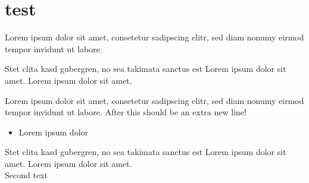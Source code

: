 \documentclass[11pt]{article}
\begin{document}
\tableofcontents
\newpage

\section{test}
Lorem ipsum dolor sit amet, consetetur sadipscing elitr, sed diam nonumy eirmod tempor invidunt ut labore.

Stet clita kasd gubergren, no sea takimata sanctus est Lorem ipsum dolor sit amet. Lorem ipsum dolor sit amet.

Lorem ipsum dolor sit amet, consetetur sadipscing elitr, sed diam nonumy eirmod tempor invidunt ut labore. After this should be an extra new line!

\begin{itemize}

\item Lorem ipsum dolor

\end{itemize}

Stet clita kasd gubergren, no sea takimata sanctus est Lorem ipsum dolor sit amet. Lorem ipsum dolor sit amet.\\

Second text\\
\end{document}

